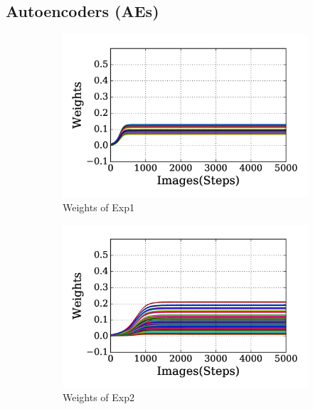 \subsection{Autoencoders (AEs)}
\label{subsec:exp_AE}
\begin{figure}
	\centering
	\begin{subfigure}[t]{0.48\textwidth}
		\includegraphics[width=\textwidth]{pics_sdlm/20_exp_AE/exp1_weights_non.png}
		\caption{Weights of Exp1}
	\end{subfigure}
	\begin{subfigure}[t]{0.48\textwidth}
		\includegraphics[width=\textwidth]{pics_sdlm/20_exp_AE/exp2_weights_non.png}
		\caption{Weights of Exp2}
	\end{subfigure}
	\begin{subfigure}[t]{0.48\textwidth}

\end{subfigure}
\end{figure}
